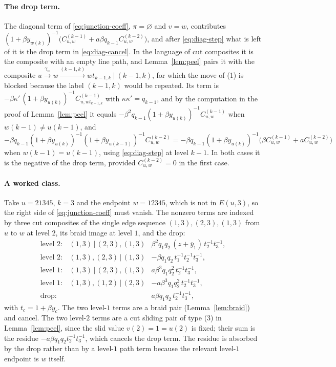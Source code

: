 \documentclass[11pt]{article}
\begin{document}
\paragraph{The drop term.}
The diagonal term of \eqref{eq:junction-coeff}, $\pi=\varnothing$ and
$v=w$, contributes $(1+\beta y_{w(k)})^{-1}\bigl(C^{(k-1)}_{u,w}+a\beta q_{k-1}C^{(k-2)}_{u,w}\bigr)$,
and after \eqref{eq:diag-step} what is left of it is the drop term
in \eqref{eq:diag-cancel}. In the language of cut composites it is
the composite with an empty line path, and Lemma~\ref{lem:peel}
pairs it with the composite
$u\xrightarrow{\gamma_w}w\xrightarrow{(k-1,k)}wt_{k-1,k}\ \big|\ (k-1,k)$,
for which the move of (1) is blocked because the label $(k-1,k)$ would
be repeated. Its term is $-\beta\kappa'\,(1+\beta y_{u(k)})^{-1}C^{(k-1)}_{u,wt_{k-1,k}}$ with
$\kappa\kappa'=q_{k-1}$, and by the computation in the proof of
Lemma~\ref{lem:peel} it equals
$-\beta^2q_{k-1}(1+\beta y_{u(k)})^{-1}C^{(k-1)}_{u,w}$ when
$w(k-1)\neq u(k-1)$, and
$-\beta q_{k-1}(1+\beta y_{u(k)})^{-1}(1+\beta y_{u(k-1)})^{-1}C^{(k-2)}_{u,w}
 =-\beta q_{k-1}(1+\beta y_{u(k)})^{-1}\bigl(\beta C^{(k-1)}_{u,w}+aC^{(k-2)}_{u,w}\bigr)$
when $w(k-1)=u(k-1)$, using \eqref{eq:diag-step} at level $k-1$. In
both cases it is the negative of the drop term, provided
$C^{(k-2)}_{u,w}=0$ in the first case.

\paragraph{A worked class.}
Take $u=21345$, $k=3$ and the endpoint $w=12345$, which is not in
$E(u,3)$, so the right side of \eqref{eq:junction-coeff} must vanish.
The nonzero terms are indexed by three cut composites of the single
edge sequence $(1,3),(2,3),(1,3)$ from $u$ to $w$ at level $2$, its
braid image at level $1$, and the drop:
\[
\begin{array}{lll}
 \text{level }2:& (1,3)\,\big|\,(2,3),(1,3) & \beta^2q_1q_2\,(z+\overline y_1)\,t_2^{-1}t_3^{-1},\\
 \text{level }2:& (1,3),(2,3)\,\big|\,(1,3) & -\beta q_1q_2\,t_1^{-1}t_2^{-1}t_3^{-1},\\
 \text{level }1:& (1,3)\,\big|\,(2,3),(1,3) & a\beta^3q_1q_2^2\,t_2^{-1}t_3^{-1},\\
 \text{level }1:& (1,3),(1,2)\,\big|\,(2,3) & -a\beta^3q_1q_2^2\,t_2^{-1}t_3^{-1},\\
 \text{drop}:& & a\beta q_1q_2\,t_2^{-1}t_3^{-1},
\end{array}
\]
with $t_c=1+\beta y_c$. The two level-$1$ terms are a braid pair
(Lemma~\ref{lem:braid}) and cancel. The two level-$2$ terms are a cut
sliding pair of type (3) in Lemma~\ref{lem:peel}, since the slid
value $v(2)=1=u(2)$ is fixed; their sum is the residue
$-a\beta q_1q_2t_2^{-1}t_3^{-1}$, which cancels the drop term. The
residue is absorbed by the drop rather than by a level-$1$ path term
because the relevant level-$1$ endpoint is $w$ itself.
\end{document}

